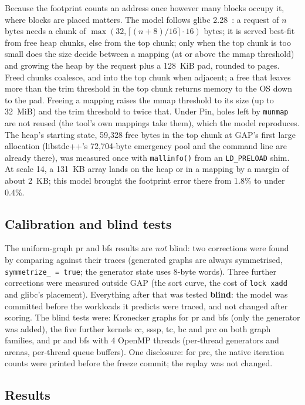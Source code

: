\documentclass[11pt]{article}
\newcommand{\code}[1]{\texttt{#1}}
\begin{document}
Because the footprint counts an address once however many blocks occupy it, where blocks are placed matters. The
model follows glibc 2.28~\cite{glibcmanual}: a request of $n$ bytes needs a chunk of $\max(32, \lceil
(n+8)/16\rceil\cdot16)$ bytes; it is served best-fit from free heap chunks, else from the top chunk; only when the top
chunk is too small does the size decide between a mapping (at or above the mmap threshold) and growing the heap by the
request plus a 128~KiB pad, rounded to pages. Freed chunks coalesce, and into the top chunk when adjacent; a free that
leaves more than the trim threshold in the top chunk returns memory to the OS down to the pad. Freeing a mapping
raises the mmap threshold to its size (up to 32~MiB) and the trim threshold to twice that. Under Pin, holes left by
\code{munmap} are not reused (the tool's own mappings take them), which the model reproduces. The heap's starting
state, 59{,}328 free bytes in the top chunk at GAP's first large allocation (libstdc++'s 72{,}704-byte emergency pool
and the command line are already there), was measured once with \code{mallinfo()} from an \code{LD\_PRELOAD} shim.
At scale 14, a 131~KB array lands on the heap or in a mapping by a margin of about 2~KB; this model brought the
footprint error there from 1.8\% to under 0.4\%.

\subsection{Calibration and blind tests}

The uniform-graph pr and bfs results are \emph{not} blind: two corrections were found by comparing against their
traces (generated graphs are always symmetrised, \code{symmetrize\_ = true}; the generator state uses 8-byte words).
Three further corrections were measured outside GAP (the sort curve, the cost of \code{lock xadd} and glibc's
placement). Everything after that was tested \textbf{blind}: the model was committed before the workloads it predicts
were traced, and not changed after scoring. The blind tests were: Kronecker graphs for pr and bfs (only the generator
was added), the five further kernels cc, sssp, tc, bc and prc on both graph families, and pr and bfs with 4 OpenMP
threads (per-thread generators and arenas, per-thread queue buffers). One disclosure: for prc, the native iteration
counts were printed before the freeze commit; the replay was not changed.

\subsection{Results}
\end{document}
